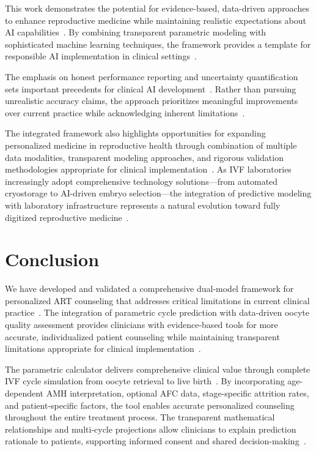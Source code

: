 \documentclass[pdflatex,sn-basic]{sn-jnl}%
\begin{document}
This work demonstrates the potential for evidence-based, data-driven approaches to enhance reproductive medicine while maintaining realistic expectations about AI capabilities~\cite{topol2019high}. By combining transparent parametric modeling with sophisticated machine learning techniques, the framework provides a template for responsible AI implementation in clinical settings~\cite{rudin2019stop}.

The emphasis on honest performance reporting and uncertainty quantification sets important precedents for clinical AI development~\cite{varoquaux2022machine}. Rather than pursuing unrealistic accuracy claims, the approach prioritizes meaningful improvements over current practice while acknowledging inherent limitations~\cite{rajkomar2019machine}.

The integrated framework also highlights opportunities for expanding personalized medicine in reproductive health through combination of multiple data modalities, transparent modeling approaches, and rigorous validation methodologies appropriate for clinical implementation~\cite{li2020federated,topol2019high}. As IVF laboratories increasingly adopt comprehensive technology solutions—from automated cryostorage to AI-driven embryo selection—the integration of predictive modeling with laboratory infrastructure represents a natural evolution toward fully digitized reproductive medicine~\cite{go2023deep}. 

\section{Conclusion}\label{sec:conclusion}

We have developed and validated a comprehensive dual-model framework for personalized ART counseling that addresses critical limitations in current clinical practice~\cite{gameiro2023understanding,asrm2017embryo}. The integration of parametric cycle prediction with data-driven oocyte quality assessment provides clinicians with evidence-based tools for more accurate, individualized patient counseling while maintaining transparent limitations appropriate for clinical implementation~\cite{fda2022clinical}.

The parametric calculator delivers comprehensive clinical value through complete IVF cycle simulation from oocyte retrieval to live birth~\cite{lee2017amh,song2021amh}. By incorporating age-dependent AMH interpretation, optional AFC data, stage-specific attrition rates, and patient-specific factors, the tool enables accurate personalized counseling throughout the entire treatment process. The transparent mathematical relationships and multi-cycle projections allow clinicians to explain prediction rationale to patients, supporting informed consent and shared decision-making~\cite{beauchamp2019principles,asrm2021counselors}.
\end{document}
